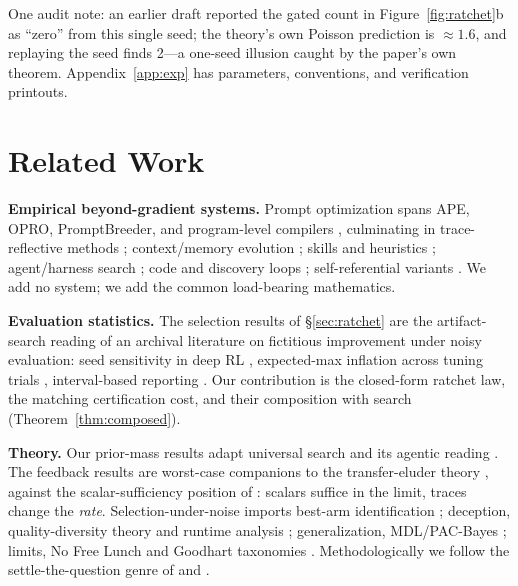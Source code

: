 \documentclass{article}
\theoremstyle{plain}
\theoremstyle{definition}
\theoremstyle{remark}
\begin{document}
One audit note: an earlier draft reported the gated count in Figure~\ref{fig:ratchet}b as ``zero'' from this single seed; the theory's own Poisson prediction is $\approx 1.6$, and replaying the seed finds 2---a one-seed illusion caught by the paper's own theorem. Appendix~\ref{app:exp} has parameters, conventions, and verification printouts.

\section{Related Work}
\label{sec:related}

\textbf{Empirical beyond-gradient systems.} Prompt optimization spans APE, OPRO, PromptBreeder, and program-level compilers \citep{zhou2023ape, yang2024opro, fernando2023promptbreeder, khattab2024dspy, opsahlong2024mipro}, culminating in trace-reflective methods \citep{agrawal2025gepa, yuksekgonul2024textgrad, cheng2024trace}; context/memory evolution \citep{zhang2025ace, packer2023memgpt, suzgun2025cheatsheet}; skills and heuristics \citep{yang2026skillopt, weng2026hl}; agent/harness search \citep{hu2025adas, zhang2025dgm, lee2026metaharness}; code and discovery loops \citep{romeraparedes2024funsearch, novikov2025alphaevolve, karpathy2026autoresearch}; self-referential variants \citep{zelikman2024stop}. We add no system; we add the common load-bearing mathematics.

\textbf{Evaluation statistics.} The selection results of \S\ref{sec:ratchet} are the artifact-search reading of an archival literature on fictitious improvement under noisy evaluation: seed sensitivity in deep RL \citep{henderson2018matters}, expected-max inflation across tuning trials \citep{dodge2019show}, interval-based reporting \citep{agarwal2021precipice}. Our contribution is the closed-form ratchet law, the matching certification cost, and their composition with search (Theorem~\ref{thm:composed}).

\textbf{Theory.} Our prior-mass results adapt universal search \citep{levin1973universal, schmidhuber2004oops, hutter2005universal} and its agentic reading \citep{achille2025universal}. The feedback results are worst-case companions to the transfer-eluder theory \citep{xu2025llf, cheng2023llfbench}, against the scalar-sufficiency position of \citet{silver2021reward}: scalars suffice in the limit, traces change the \emph{rate}. Selection-under-noise imports best-arm identification \citep{evendar2006action, karnin2013almost, li2017hyperband}; deception, quality-diversity theory \citep{lehman2011abandoning, mouret2015illuminating} and runtime analysis \citep{droste2002analysis}; generalization, MDL/PAC-Bayes \citep{rissanen1978modeling, mcallester1999pac}; limits, No Free Lunch \citep{wolpert1997no} and Goodhart taxonomies \citep{manheim2018categorizing, amodei2016concrete}. Methodologically we follow the settle-the-question genre of \citet{bowling2023settling} and \citet{richens2025general}.
\end{document}
